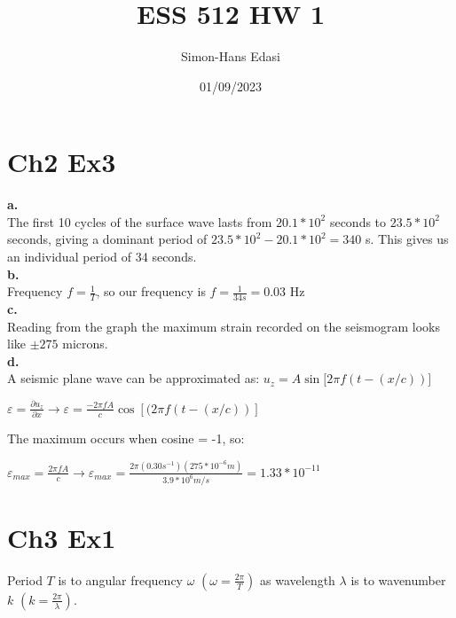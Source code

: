 \documentclass{article}
\title{ESS 512 HW 1}
\date{01/09/2023}
\author{Simon-Hans Edasi}
\begin{document}
	\maketitle



\section{Ch2 Ex3}
\textbf{a.} \\
The first 10 cycles of the surface wave lasts from $20.1 * 10^2$ seconds to $23.5*10^2$ seconds, giving a dominant period of $23.5 * 10^2 - 20.1 * 10^2 = 340$ s. This gives us an individual period of 34 seconds. \\

\textbf{b.} \\
Frequency $f = \frac{1}{T}$, so our frequency is $f = \frac{1}{34s} = 0.03$ Hz \\

\textbf{c.}\\
Reading from the graph the maximum strain recorded on the seismogram looks like $\pm{275}$ microns. \\

\textbf{d.}\\
A seismic plane wave can be approximated as: $u_{z} = A \sin[{2\pi f(t - (x / c))]}$ \\

\begin{center}

$
\varepsilon = \frac{\partial{u_z}}{\partial{x}} \rightarrow \varepsilon = \frac{- 2  \pi f A}{c}\cos \left[(2\pi f \left(t - \left(x / c\right)\right) \right]
$
\end{center}

The maximum occurs when cosine = -1, so:

\begin{center}
$
\varepsilon_{max} = \frac{2  \pi f A}{c} \rightarrow \varepsilon_{max} = \frac{2\pi \left( 0.30 s^{-1}\right)\left( 275 * 10^{-6} m\right)}{3.9 * 10^{6} m/s} = 1.33 * 10^{-11}
$
\end{center}





 



\section{Ch3 Ex1}
Period $T$ is to angular frequency $\omega$ $\left(\omega = \frac{2\pi}{T}\right)$ as wavelength $\lambda$ is to wavenumber $k$ $\left(k = \frac{2\pi}{\lambda}\right)$.
\end{document}

